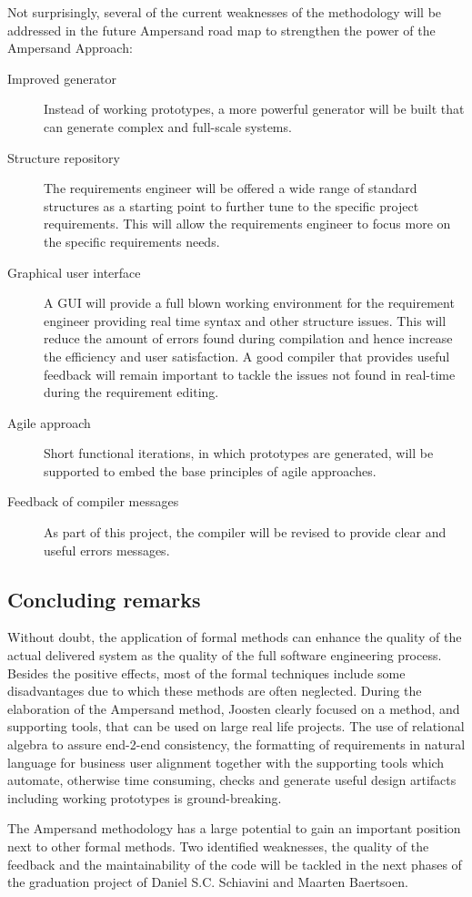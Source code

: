 Not surprisingly, several of the current weaknesses of the methodology will be addressed in the future Ampersand road map to strengthen the power of the Ampersand Approach:
\begin{description}
	\item[Improved generator] Instead of working prototypes, a more powerful generator will be built that can generate complex and full-scale systems.
	\item[Structure repository] The requirements engineer will be offered a wide range of standard structures as a starting point to further tune to the specific project requirements.
	This will allow the requirements engineer to focus more on the specific requirements needs.
	\item[Graphical user interface] A GUI will provide a full blown working environment for the requirement engineer providing real time syntax and other structure issues. 
	This will reduce the amount of errors found during compilation and hence increase the efficiency and user satisfaction. 
	A good compiler that provides useful feedback will remain important to tackle the issues not found in real-time during the requirement editing.
	\item[Agile approach] Short functional iterations, in which prototypes are generated, will be supported to embed the base principles of agile approaches.
	\item[Feedback of compiler messages] As part of this project, the compiler will be revised to provide clear and useful errors messages.
\end{description}

\subsection{Concluding remarks}
Without doubt, the application of formal methods can enhance the quality of the actual delivered system as the quality of the full software engineering process. 
Besides the positive effects, most of the formal techniques include some disadvantages due to which these methods are often neglected. 
During the elaboration of the Ampersand method, Joosten clearly focused on a method, and supporting tools, that can be used on large real life projects. 
The use of relational algebra to assure end-2-end consistency, the formatting of requirements in natural language for business user alignment together with the supporting tools which automate, otherwise time consuming, checks and  generate useful design artifacts including working prototypes is ground-breaking.

The Ampersand methodology has a large potential to gain an important position next to other formal methods. 
Two identified weaknesses, the quality of the feedback and the maintainability of the code will be tackled in the next phases of the graduation project of  Daniel S.C. Schiavini and Maarten Baertsoen.






